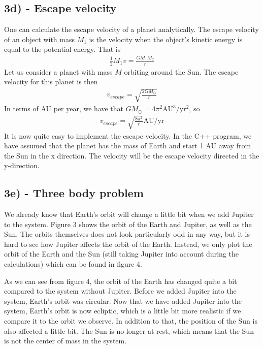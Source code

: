 \documentclass[12pt]{article}
\begin{document}
\subsection*{3d) - Escape velocity}
One can calculate the escape velocity of a planet analytically. The escape velocity of an object with mass $M_1$ is the velocity when the object's kinetic energy is equal to the potential energy. That is
\begin{align*}
\frac{1}{2}M_1v = \frac{GM_1M_2}{r}
\end{align*}
Let us consider a planet with mass $M$ orbiting around the Sun. The escape velocity for this planet is then
\begin{align*}
v_{escape} = \sqrt{\frac{2GM_{\odot}}{r}}
\end{align*}
In terms of AU per year, we have that $GM_{\odot} = 4\pi^2 \text{AU}^3/\text{yr}^2$, so
\begin{align*}
v_{escape} = \sqrt{\frac{8\pi^2}{r}} \text{AU}/\text{yr}
\end{align*}
It is now quite easy to implement the escape velocity. In the C++ program, we have assumed that the planet has the mass of Earth and start 1 AU away from the Sun in the x direction. The velocity will be the escape velocity directed in the y-direction.

\newpage 
\subsection*{3e) - Three body problem}
We already know that Earth's orbit will change a little bit when we add Jupiter to the system. Figure 3 shows the orbit of the Earth and Jupiter, as well as the Sun. The orbits themselves does not look particularly odd in any way, but it is hard to see how Jupiter affects the orbit of the Earth. Instead, we only plot the orbit of the Earth and the Sun (still taking Jupiter into account during the calculations) which can be found in figure 4. 

As we can see from figure 4, the orbit of the Earth has changed quite a bit compared to the system without Jupiter. Before we added Jupiter into the system, Earth's orbit was circular. Now that we have added Jupiter into the system, Earth's orbit is now ecliptic, which is a little bit more realistic if we compare it to the orbit we observe. In addition to that, the position of the Sun is also affected a little bit. The Sun is no longer at rest, which means that the Sun is not the center of mass in the system.
\end{document}
